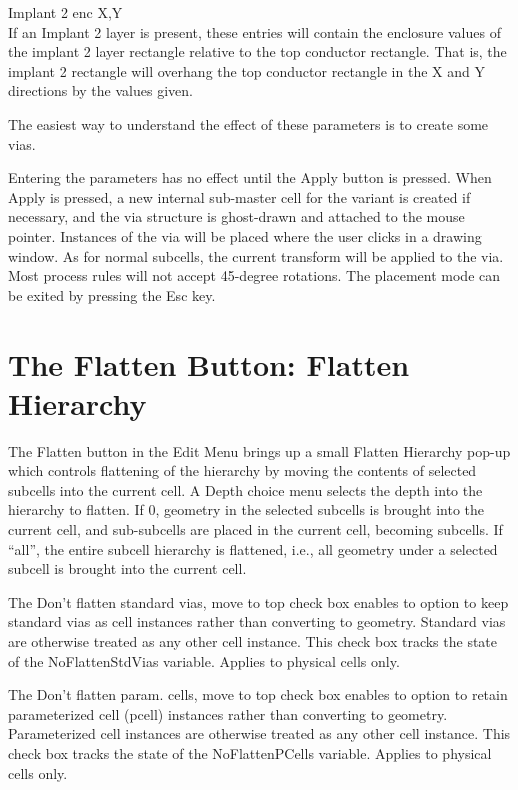 \begin{description}
\item{\cb Implant 2 enc X,Y}\\
If an {\cb Implant 2} layer is present, these entries will contain the
enclosure values of the implant 2 layer rectangle relative to the top
conductor rectangle.  That is, the implant 2 rectangle will overhang
the top conductor rectangle in the X and Y directions by the values
given.
\end{description}

The easiest way to understand the effect of these parameters is to
create some vias.

Entering the parameters has no effect until the {\cb Apply} button is
pressed.  When {\cb Apply} is pressed, a new internal sub-master cell
for the variant is created if necessary, and the via structure is
ghost-drawn and attached to the mouse pointer.  Instances of the via
will be placed where the user clicks in a drawing window.  As for
normal subcells, the current transform will be applied to the via. 
Most process rules will not accept 45-degree rotations.  The placement
mode can be exited by pressing the {\kb Esc} key.


\section{The {\cb Flatten} Button: Flatten Hierarchy}
The {\cb Flatten} button in the {\cb Edit Menu} brings up a small {\cb
Flatten Hierarchy} pop-up which controls flattening of the hierarchy
by moving the contents of selected subcells into the current cell.  A
{\cb Depth} choice menu selects the depth into the hierarchy to
flatten.  If 0, geometry in the selected subcells is brought into the
current cell, and sub-subcells are placed in the current cell,
becoming subcells.  If ``{\vt all}'', the entire subcell hierarchy is
flattened, i.e., all geometry under a selected subcell is brought into
the current cell.

The {\cb Don't flatten standard vias, move to top} check box enables
to option to keep standard vias as cell instances rather than
converting to geometry.  Standard vias are otherwise treated as any
other cell instance.  This check box tracks the state of the {\et
NoFlattenStdVias} variable.  Applies to physical cells only.

The {\cb Don't flatten param.  cells, move to top} check box enables
to option to retain parameterized cell (pcell) instances rather than
converting to geometry.  Parameterized cell instances are otherwise
treated as any other cell instance.  This check box tracks the state
of the {\et NoFlattenPCells} variable.  Applies to physical cells
only.

